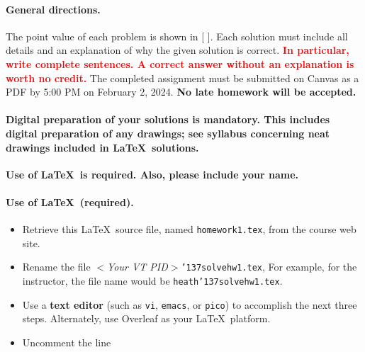 \documentclass[11pt,twoside]{article}
\newcommand{\myunderscore}{\char'137}
\newcommand{\duedate}{February 2, 2024}
\newcommand{\homeworknumber}{1}
\newcounter{problem}
\begin{document}
{
    \begingroup %
    \paragraph{General directions.}
    The point value of each problem is shown in [ ].
    Each solution must include all details and
    an explanation of why the given solution is correct.
    \textbf{\textcolor{red}{In particular,
            write complete sentences.
            A correct answer without an explanation is worth no credit.}}
    The completed assignment must be submitted on Canvas as a PDF by 5:00 PM
    on \duedate.
    \textbf{No late homework will be accepted.}

    \paragraph{Digital preparation of your solutions is mandatory.
        This includes digital preparation of any drawings; see syllabus
        concerning neat drawings included in \LaTeX\ solutions.}
    \textbf{Use of \LaTeX\ is required.
        Also,
        please include your name.}

    \paragraph{Use of \LaTeX\ (required).}
    \begin{itemize}
        \item Retrieve this \LaTeX\ source file,
              named
              \texttt{homework\homeworknumber.tex},
              from the course web site.
        \item Rename the file
              \textit{$<$Your VT PID$>$}\texttt{{\myunderscore}solvehw\homeworknumber.tex},
              For example,
              for the instructor,
              the file name would be
              \texttt{heath{\myunderscore}solvehw\homeworknumber.tex}.

        \item
              Use a \textbf{text editor}
              (such as \texttt{vi}, \texttt{emacs}, or \texttt{pico})
              to accomplish the next three steps.
              Alternately,
              use Overleaf as your \LaTeX\ platform.

        \item
              Uncomment the line


\end{itemize}}
\end{document}
